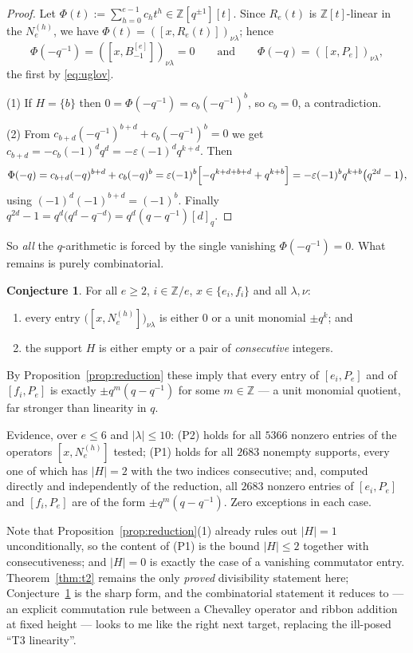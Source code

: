 \documentclass[11pt]{article}
\theoremstyle{plain}
\theoremstyle{definition}
\newtheorem{conjecture}[theorem]{Conjecture}
\newcommand{\qq}{(q-q^{-1})}
\newcommand{\Bm}{B_{-1}^{[e]}}
\newcommand{\N}[1]{N_e^{(#1)}}
\begin{document}
\begin{proof}
Let $\Phi(t):=\sum_{h=0}^{e-1}c_h t^h\in\mathbb{Z}[q^{\pm1}][t]$.  Since
$R_e(t)$ is $\mathbb{Z}[t]$-linear in the $\N{h}$, we have
$\Phi(t)=([x,R_e(t)])_{\nu\lambda}$; hence
\[
  \Phi(-q^{-1})=([x,\Bm])_{\nu\lambda}=0
  \qquad\text{and}\qquad
  \Phi(-q)=([x,P_e])_{\nu\lambda},
\]
the first by \eqref{eq:uglov}.

(1) If $H=\{b\}$ then $0=\Phi(-q^{-1})=c_b(-q^{-1})^{b}$, so $c_b=0$, a
contradiction.

(2) From $c_{b+d}(-q^{-1})^{b+d}+c_b(-q^{-1})^{b}=0$ we get
$c_{b+d}=-c_b(-1)^{d}q^{d}=-\varepsilon(-1)^{d}q^{k+d}$.  Then
\[
  \Phi(-q)=c_{b+d}(-q)^{b+d}+c_b(-q)^{b}
   =\varepsilon(-1)^{b}\Bigl[-q^{k+d+b+d}+q^{k+b}\Bigr]
   =-\varepsilon(-1)^{b}q^{k+b}\bigl(q^{2d}-1\bigr),
\]
using $(-1)^{d}(-1)^{b+d}=(-1)^{b}$.  Finally
$q^{2d}-1=q^{d}\bigl(q^{d}-q^{-d}\bigr)=q^{d}\qq[d]_q$.
\end{proof}

So \emph{all} the $q$-arithmetic is forced by the single vanishing
$\Phi(-q^{-1})=0$.  What remains is purely combinatorial.

\begin{conjecture}\label{conj:sharp}
For all $e\ge2$, $i\in\mathbb{Z}/e$, $x\in\{e_i,f_i\}$ and all $\lambda,\nu$:
\begin{enumerate}
\item[\textup{(P2)}] every entry $\bigl([x,\N{h}]\bigr)_{\nu\lambda}$ is
  either $0$ or a unit monomial $\pm q^{k}$; and
\item[\textup{(P1)}] the support $H$ is either empty or a pair of
  \emph{consecutive} integers.
\end{enumerate}
By Proposition~\ref{prop:reduction} these imply that every entry of
$[e_i,P_e]$ and of $[f_i,P_e]$ is exactly $\pm q^{m}\qq$ for some
$m\in\mathbb{Z}$ --- a unit monomial quotient, far stronger than linearity in
$q$.
\end{conjecture}

Evidence, over $e\le6$ and $|\lambda|\le10$: (P2) holds for all $5366$
nonzero entries of the operators $[x,\N{h}]$ tested; (P1) holds for all
$2683$ nonempty supports, every one of which has $|H|=2$ with the two indices
consecutive; and, computed directly and independently of the reduction, all
$2683$ nonzero entries of $[e_i,P_e]$ and $[f_i,P_e]$ are of the form
$\pm q^{m}\qq$.  Zero exceptions in each case.

Note that Proposition~\ref{prop:reduction}(1) already rules out $|H|=1$
unconditionally, so the content of (P1) is the bound $|H|\le2$ together with
consecutiveness; and $|H|=0$ is exactly the case of a vanishing commutator
entry.  Theorem~\ref{thm:t2} remains the only \emph{proved} divisibility
statement here; Conjecture~\ref{conj:sharp} is the sharp form, and the
combinatorial statement it reduces to --- an explicit commutation rule
between a Chevalley operator and ribbon addition at fixed height --- looks to
me like the right next target, replacing the ill-posed ``T3 linearity''.
\end{document}
